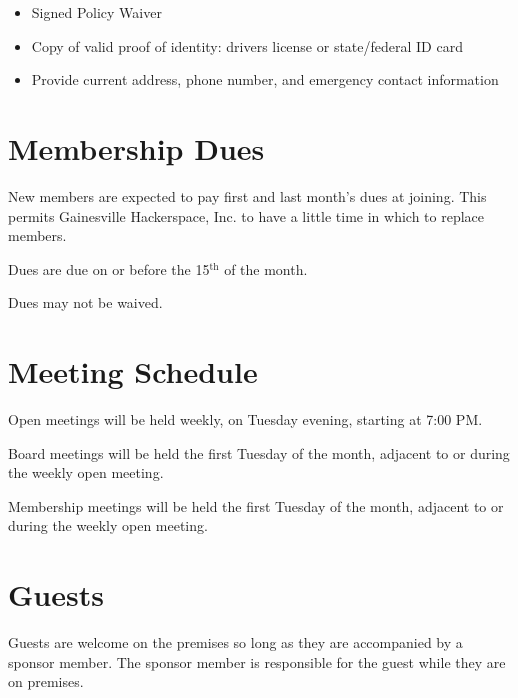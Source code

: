\documentclass[10pt,letterpaper,titlepage]{article}
\newcommand\corpname{Gainesville Hackerspace, Inc.}
\newcommand{\superscript}[1]{\ensuremath{^{\textrm{#1}}}}
\renewcommand{\th}[0]{\superscript{th}}
\begin{document}
\begin{itemize}
    \item Signed Policy Waiver
    \item Copy of valid proof of identity: drivers license or state/federal ID 
    card
    \item Provide current address, phone number, and emergency contact 
    information
\end{itemize}

\section{Membership Dues}
\label{dues}

New members are expected to pay first and last month's dues at joining. This
permits \corpname{} to have a little time in which to replace members.

Dues are due on or before the 15\th{} of the month.

Dues may not be waived.

\section{Meeting Schedule}

Open meetings will be held weekly, on Tuesday evening, starting at 7:00 PM.

Board meetings will be held the first Tuesday of the month, adjacent
to or during the weekly open meeting.

Membership meetings will be held the first Tuesday of the month,
adjacent to or during the weekly open meeting.

\section{Guests}
Guests are welcome on the premises so long as they are accompanied by a sponsor
member. The sponsor member is responsible for the guest while they are on
premises.
\end{document}
